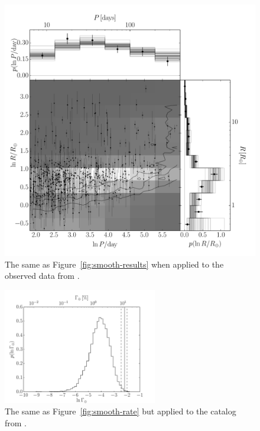 \documentclass[12pt,preprint]{aastex}
\newcommand{\Fig}[1]{Figure~\ref{fig:#1}}
\newcommand{\fig}[1]{\Fig{#1}}
\newcommand{\figlabel}[1]{\label{fig:#1}}
\begin{document}
\begin{figure}[p]
\begin{center}
\includegraphics[width=\textwidth]{figures/results/results.pdf}
\end{center}
\caption{%
The same as \fig{smooth-results} when applied to the observed data from
\citet{petigura}.
\figlabel{real-results}}
\end{figure}

\begin{figure}[p]
\begin{center}
\includegraphics[width=0.6\textwidth]{figures/results/rate.pdf}
\end{center}
\caption{%
The same as \fig{smooth-rate} but applied to the catalog from \citet{petigura}.
\figlabel{real-rate}}
\end{figure}
\end{document}
